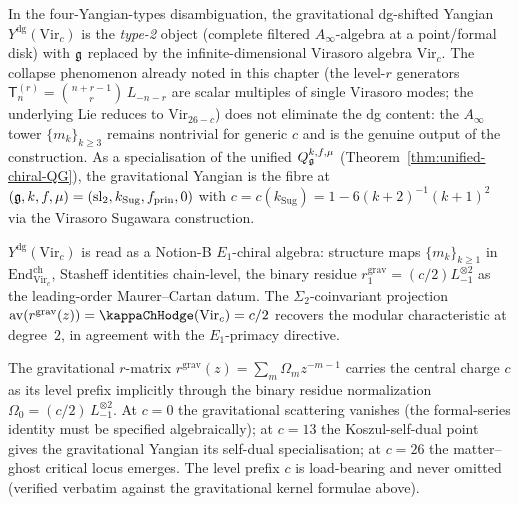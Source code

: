 \begin{remark}
\label{rem:thqg-gravitational-yangian-yangian-type}
In the four-Yangian-types disambiguation, the gravitational
dg-shifted Yangian $Y^{\mathrm{dg}}(\mathrm{Vir}_c)$ is the
\emph{type-2} object (complete filtered $A_\infty$-algebra at a
point/formal disk) with
$\mathfrak{g}$ replaced by the infinite-dimensional Virasoro algebra
$\mathrm{Vir}_c$. The collapse phenomenon already noted in this
chapter (the level-$r$ generators $\mathsf{T}_n^{(r)} = \binom{n+r-1}{r}\,L_{-n-r}$ are scalar multiples of single
Virasoro modes; the underlying Lie reduces to
$\mathrm{Vir}_{26-c}$) does not eliminate the dg content: the
$A_\infty$ tower $\{m_k\}_{k\ge 3}$ remains nontrivial for generic
$c$ and is the genuine output of the construction. As a
specialisation of the unified
$Q_{\mathfrak{g}}^{k,f,\mu}$ (Theorem~\ref{thm:unified-chiral-QG}),
the gravitational Yangian is the fibre at $(\mathfrak{g}, k, f, \mu) =
(\mathrm{sl}_2, k_{\mathrm{Sug}}, f_{\mathrm{prin}}, 0)$ with
$c = c(k_{\mathrm{Sug}}) = 1 - 6(k+2)^{-1}(k+1)^2$ via the
Virasoro Sugawara construction.
\end{remark}

\begin{remark}
\label{rem:thqg-gravitational-yangian-notion-b}
$Y^{\mathrm{dg}}(\mathrm{Vir}_c)$ is read as a Notion-B
$E_1$-chiral algebra: structure maps $\{m_k\}_{k\ge 1}$ in
$\mathrm{End}^{\mathrm{ch}}_{\mathrm{Vir}_c}$, Stasheff identities
chain-level, the binary residue $r^{\mathrm{grav}}_1 = (c/2)
L_{-1}^{\otimes 2}$ as the leading-order Maurer--Cartan datum.
The $\Sigma_2$-coinvariant projection
$\mathrm{av}(r^{\mathrm{grav}}(z)) = \kappaChHodge(\mathrm{Vir}_c) = c/2$
recovers the modular characteristic at degree~$2$, in agreement
with the $E_1$-primacy directive.
\end{remark}

\begin{remark}
\label{rem:thqg-gravitational-yangian-rmatrix}
The gravitational $r$-matrix $r^{\mathrm{grav}}(z) = \sum_m \Omega_m
z^{-m-1}$ carries the central charge $c$ as its level prefix
implicitly through the binary residue normalization
$\Omega_0 = (c/2)\,L_{-1}^{\otimes 2}$. At $c=0$ the
gravitational scattering vanishes (the formal-series identity must
be specified algebraically); at $c=13$ the Koszul-self-dual point
gives the gravitational Yangian its self-dual specialisation; at
$c=26$ the matter--ghost critical locus emerges. The level prefix
$c$ is load-bearing and never omitted (verified
verbatim against the gravitational kernel formulae above).
\end{remark}

